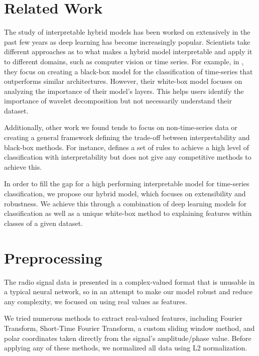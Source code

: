 \documentclass{turabian-thesis}
\begin{document}

\chapter{Related Work}
\label{chap:relatedwork}

The study of interpretable hybrid models has been worked on extensively in the past few years as deep learning has become increasingly popular. Scientists take different approaches as to what makes a hybrid model interpretable and apply it to different domains, such as computer vision or time series. For example, in \cite{wang_multilevel_2018}, they focus on creating a black-box model for the classification of time-series that outperforms similar architectures. However, their white-box model focuses on analyzing the importance of their model's layers. This helps users identify the importance of wavelet decomposition but not necessarily understand their dataset. 

Additionally, other work we found tends to focus on non-time-series data or creating a general framework defining the trade-off between interpretability and black-box methods. For instance, \cite{wang_hybrid_2019} defines a set of rules to achieve a high level of classification with interpretability but does not give any competitive methods to achieve this. 

In order to fill the gap for a high performing interpretable model for time-series classification, we propose our hybrid model, which focuses on extensibility and robustness. We achieve this through a combination of deep learning models for classification as well as a unique white-box method to explaining features within classes of a given dataset.


\chapter{Preprocessing}
\label{chap:preprocessing}

The radio signal data is presented in a complex-valued format that is unusable in a typical neural network, so in an attempt to make our model robust and reduce any complexity, we focused on using real values as features.

We tried numerous methods to extract real-valued features, including Fourier Transform, Short-Time Fourier Transform, a custom sliding window method, and polar coordinates taken directly from the signal's amplitude/phase value. Before applying any of these methods, we normalized all data using L2 normalization.
\end{document}

